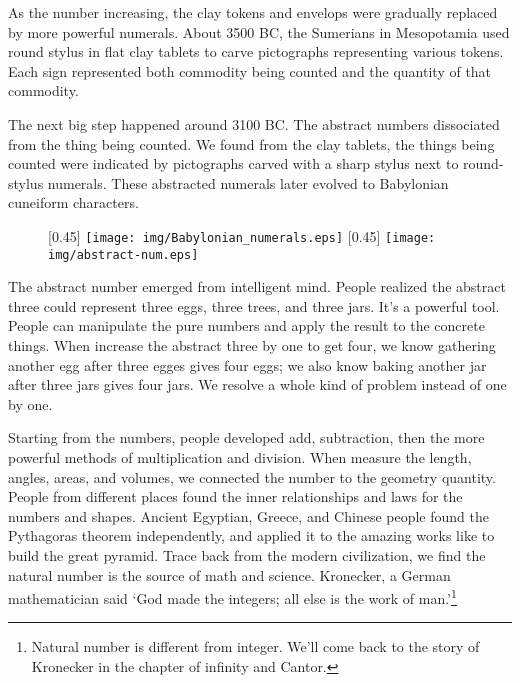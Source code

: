 \documentclass[UTF8]{article}
\begin{document}
As the number increasing, the clay tokens and envelops were gradually replaced by more powerful numerals. About 3500 BC, the Sumerians in Mesopotamia used round stylus in flat clay tablets to carve pictographs representing various tokens. Each sign represented both commodity being counted and the quantity of that commodity.

The next big step happened around 3100 BC. The abstract numbers dissociated from the thing being counted. We found from the clay tablets, the things being counted were indicated by pictographs carved with a sharp stylus next to round-stylus numerals. These abstracted numerals later evolved to Babylonian cuneiform characters.

\begin{figure}[htbp]
 \centering
 [0.45\linewidth]{
   \texttt{[image: img/Babylonian\_numerals.eps]}} \quad \quad
 [0.45\linewidth]{
   \texttt{[image: img/abstract-num.eps]}}
 \captionsetup{labelformat=empty}
 \label{fig:babylonian-num}
 \label{fig:abstract-num}
\end{figure}

The abstract number emerged from intelligent mind. People realized the abstract three could represent three eggs, three trees, and three jars. It's a powerful tool. People can manipulate the pure numbers and apply the result to the concrete things. When increase the abstract three by one to get four, we know gathering another egg after three egges gives four eggs; we also know baking another jar after three jars gives four jars. We resolve a whole kind of problem instead of one by one.

Starting from the numbers, people developed add, subtraction, then the more powerful methods of multiplication and division. When measure the length, angles, areas, and volumes, we connected the number to the geometry quantity. People from different places found the inner relationships and laws for the numbers and shapes. Ancient Egyptian, Greece, and Chinese people found the Pythagoras theorem independently, and applied it to the amazing works like to build the great pyramid. Trace back from the modern civilization, we find the natural number is the source of math and science. Kronecker, a German mathematician said `God made the integers; all else is the work of man.'\footnote{Natural number is different from integer. We'll come back to the story of Kronecker in the chapter of infinity and Cantor.}
\end{document}
